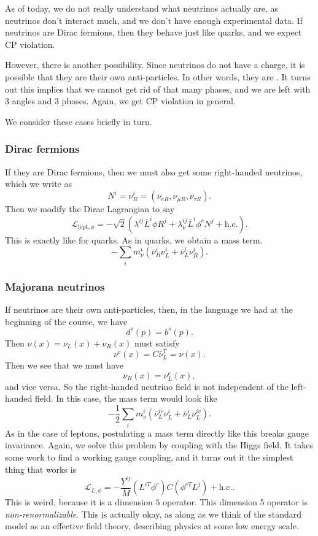 \documentclass[a4paper]{article}
\begin{document}
As of today, we do not really understand what neutrinos actually are, as neutrinos don't interact much, and we don't have enough experimental data. If neutrinos are Dirac fermions, then they behave just like quarks, and we expect CP violation.

However, there is another possibility. Since neutrinos do not have a charge, it is possible that they are their own anti-particles. In other words, they are . It turns out this implies that we cannot get rid of that many phases, and we are left with 3 angles and 3 phases. Again, we get CP violation in general.

We consider these cases briefly in turn.

\subsubsection*{Dirac fermions}
If they are Dirac fermions, then we must also get some right-handed neutrinos, which we write as
\[
  N^i = \nu_R^i = (\nu_{eR}, \nu_{\mu R}, \nu_{\tau R}).
\]
Then we modify the Dirac Lagrangian to say
\[
  \mathcal{L}_{\mathrm{lept}, \phi} = -\sqrt{2} (\lambda^{ij} \bar{L}^i \phi R^j + \lambda_\nu^{ij} \bar{L}^i \phi^c N^j + \mathrm{h.c.}).
\]
This is exactly like for quarks. As in quarks, we obtain a mass term.
\[
  - \sum_i m_\nu^i (\bar{\nu}_R^i \nu_L^i + \bar{\nu}_L^i \nu_R^i).
\]
\subsubsection*{Majorana neutrinos}
If neutrinos are their own anti-particles, then, in the language we had at the beginning of the course, we have
\[
  d^s(p) = b^s(p).
\]
Then $\nu(x) = \nu_L(x) + \nu_R(x)$ must satisfy
\[
  \nu^c(x) = C \bar{\nu}_L^T = \nu(x).
\]
Then we see that we must have
\[
  \nu_R(x) = \nu_L^c(x),
\]
and vice versa. So the right-handed neutrino field is not independent of the left-handed field. In this case, the mass term would look like
\[
  -\frac{1}{2} \sum_i m_\nu^i (\bar{\nu}_L^{ic} \nu_L^i + \bar{\nu}_L^i \nu_L^{ic}).
\]
As in the case of leptons, postulating a mass term directly like this breaks gauge invariance. Again, we solve this problem by coupling with the Higgs field. It takes some work to find a working gauge coupling, and it turns out it the simplest thing that works is
\[
  \mathcal{L}_{L, \phi} = -\frac{Y^{ij}}{M} (L^{iT} \phi^c)C (\phi^{cT} L^j) + \mathrm{h.c.}.
\]
This is weird, because it is a dimension $5$ operator. This dimension 5 operator is \emph{non-renormalizable}. This is actually okay, as along as we think of the standard model as an effective field theory, describing physics at some low energy scale.
\end{document}
